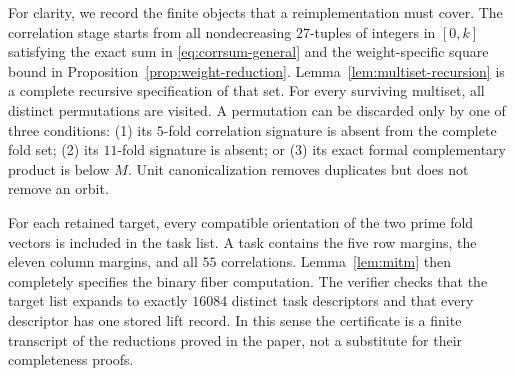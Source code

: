 \documentclass[11pt,a4paper]{article}
\theoremstyle{definition}
\theoremstyle{remark}
\begin{document}
For clarity, we record the finite objects that a reimplementation must cover.
The correlation stage starts from all nondecreasing $27$-tuples of integers in
$[0,k]$ satisfying the exact sum in \eqref{eq:corrsum-general} and the
weight-specific square bound in Proposition~\ref{prop:weight-reduction}.
Lemma~\ref{lem:multiset-recursion} is a complete recursive specification of
that set.  For every surviving multiset, all distinct permutations are
visited.  A permutation can be discarded only by one of three conditions:
(1) its $5$-fold correlation signature is absent from the complete fold set;
(2) its $11$-fold signature is absent; or (3) its exact formal complementary
product is below $M$.  Unit canonicalization removes duplicates but does not
remove an orbit.

For each retained target, every compatible orientation of the two prime fold
vectors is included in the task list.  A task contains the five row margins,
the eleven column margins, and all $55$ correlations.  Lemma~\ref{lem:mitm}
then completely specifies the binary fiber computation.  The verifier checks
that the target list expands to exactly $16084$ distinct task descriptors and
that every descriptor has one stored lift record.  In this sense the
certificate is a finite transcript of the reductions proved in the paper,
not a substitute for their completeness proofs.
\end{document}
